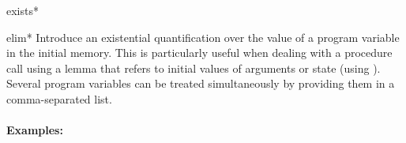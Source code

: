 \begin{tactic}{exists*}
  \begin{tsyntax}[empty]{elim*}
  Introduce an existential quantification over the value of a program
  variable in the initial memory. This is particularly useful when
  dealing with a procedure call using a lemma that refers to initial
  values of arguments or state (using ). Several program
  variables can be treated simultaneously by providing them in a
  comma-separated list.

  \paragraph{Examples:}\strut

  \begin{cmathpar}
    {}%
    {}

    {}%
    {}

    {}%
    {}

    {}%
    {}
  \end{cmathpar}

  \end{tsyntax}
\end{tactic}
